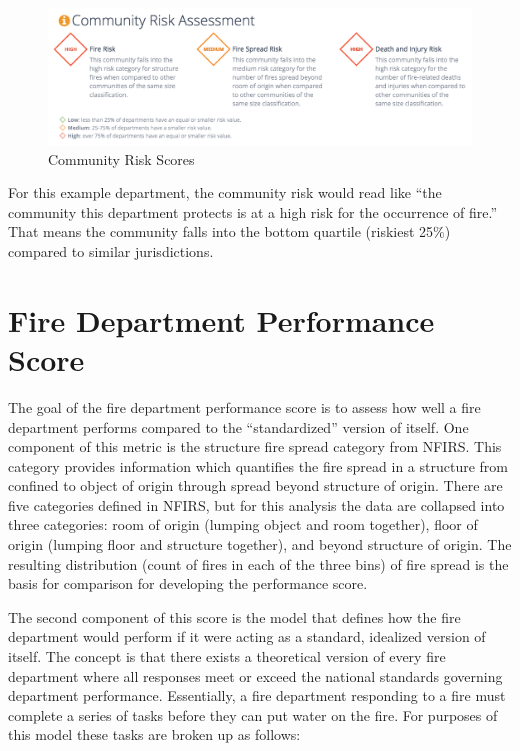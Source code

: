 \documentclass[12pt,oneside]{book}
\begin{document}
\begin{figure}[ht!]
\centering
\includegraphics[width=.9\columnwidth]{Figures/risk}
\caption{Community Risk Scores}
\label{fig:risk}
\end{figure}

For this example department, the community risk would read like ``the community this department protects is at a high risk for the occurrence of fire.'' That means the community falls into the bottom quartile (riskiest 25\%) compared to similar jurisdictions.

\section{Fire Department Performance Score}

The goal of the fire department performance score is to assess how well a fire department performs compared to the ``standardized'' version of itself. One component of this metric is the structure fire spread category from NFIRS. This category provides information which quantifies the fire spread in a structure from confined to object of origin through spread beyond structure of origin. There are five categories defined in NFIRS, but for this analysis the data are collapsed into three categories: room of origin (lumping object and room together), floor of origin (lumping floor and structure together), and beyond structure of origin. The resulting distribution (count of fires in each of the three bins) of fire spread is the basis for comparison for developing the performance score.

The second component of this score is the model that defines how the fire department would perform if it were acting as a standard, idealized version of itself. The concept is that there exists a theoretical version of every fire department where all responses meet or exceed the national standards governing department performance. Essentially, a fire department responding to a fire must complete a series of tasks before they can put water on the fire. For purposes of this model these tasks are broken up as follows:
\end{document}
